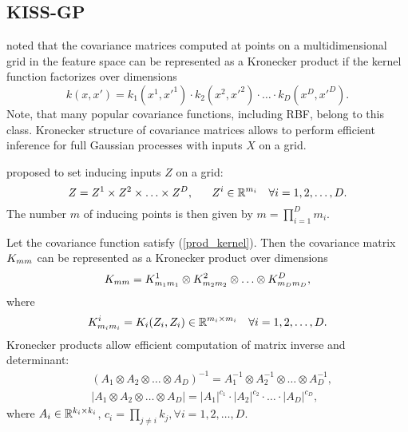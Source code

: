 \subsection{KISS-GP}
\label{kiss_gp}

  \citet{saatci2012} noted that the covariance matrices computed at points on a
  multidimensional grid in the feature space can be represented as a Kronecker
  product if the kernel function factorizes over dimensions
  \begin{equation}
  \label{prod_kernel}
    k(x, x') = k_1(x^1, x'^1)\cdot k_2(x^2, x'^2)\cdot \ldots\cdot k_D(x^D, x'^D).
  \end{equation}
  Note, that many popular covariance functions, including RBF, belong to this class.
  Kronecker structure of covariance matrices allows to perform efficient inference
  for full Gaussian processes with inputs $X$ on a grid.

  \citet{wilson2015} proposed to set inducing inputs $Z$ on a grid:
  \[
    Z = Z^1 \times Z^2 \times \ldots \times Z^D,~~~~~Z^i \in \mathbb{R}^{m_i}~~~\forall i = 1, 2, \ldots, D.
  \]
  The number $m$ of inducing points is then given by $m = \prod_{i=1}^D m_{i}$.

  Let the covariance function satisfy (\ref{prod_kernel}). Then the covariance
  matrix $K_{mm}$ can be represented as a Kronecker product over dimensions
  \[
    K_{mm} = K_{m_1 m_1}^1 \otimes K^2_{m_2 m_2} \otimes \ldots \otimes
    K^D_{m_D m_D},
  \]
  where
  \[
    K^i_{m_i m_i} = K_i(Z_i, Z_i) \in \mathbb{R}^{m_i \times m_i}~~~\forall i = 1, 2, \ldots, D.
  \]
  Kronecker products allow efficient computation of matrix inverse and determinant:
  \begin{align*}
    &(A_1 \otimes A_2 \otimes \ldots \otimes A_D)^{-1} = A_1^{-1} \otimes A_2^{-1} \otimes \ldots \otimes A_D^{-1},\\
    &|A_1 \otimes A_2 \otimes \ldots \otimes A_D| = |A_1|^{c_1} \cdot |A_2|^{c_2} \cdot \ldots \cdot |A_D|^{c_D},
  \end{align*}
  where $A_i\in\mathbb{R}^{k_i \times k_i}$, $c_i = \prod_{j \ne i} k_j,\forall i = 1, 2, \ldots, D$.
  
